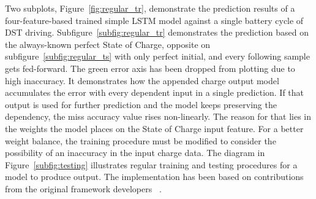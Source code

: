 %
%
Two subplots, \mbox{Figure~\ref{fig:regular_tr}}, demonstrate the prediction results of a four-feature-based trained simple LSTM model against a single battery cycle of DST driving.
\mbox{Subfigure~\ref{subfig:regular_tr}} demonstrates the prediction based on the always-known perfect State of Charge, opposite on \mbox{subfigure~\ref{subfig:regular_ts}} with only perfect initial, and every following sample gets fed-forward.
The green error axis has been dropped from plotting due to high inaccuracy.
It demonstrates how the appended charge output model accumulates the error with every dependent input in a single prediction.
If that output is used for further prediction and the model keeps preserving the dependency, the miss accuracy value rises non-linearly.
The reason for that lies in the weights the model places on the State of Charge input feature.
For a better weight balance, the training procedure must be modified to consider the possibility of an inaccuracy in the input charge data.
The diagram in \mbox{Figure~\ref{subfig:testing}} illustrates regular training and testing procedures for a model to produce output.
The implementation has been based on contributions from the original framework developers ~\cite{time_2020}.
